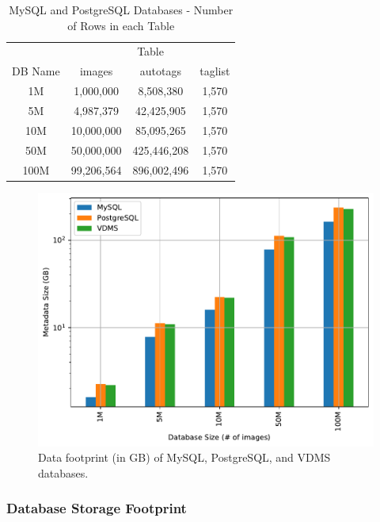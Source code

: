 \begin{table}[ht]
\caption{MySQL and PostgreSQL Databases - Number of Rows in each Table}
\centering
\begin{tabular}{c c c c}
\hline\hline
 & \multicolumn{3}{c}{Table}\\
\cline{2-4}
DB Name & images & autotags & taglist\\
\hline
1M   & 1,000,000  & 8,508,380   & 1,570\\
5M   & 4,987,379  & 42,425,905  & 1,570\\
10M  & 10,000,000 & 85,095,265  & 1,570\\
50M  & 50,000,000 & 425,446,208 & 1,570\\
100M & 99,206,564 & 896,002,496 & 1,570\\
\hline
\end{tabular}
\label{table:mysqltables}
\end{table}


\begin{figure}[ht]
\centering
\includegraphics[width=0.8\columnwidth]{figures/all_build_sizes_plot}
\caption{Data footprint (in GB) of MySQL, PostgreSQL, and VDMS databases.}
\label{fig:db_sizes}
\end{figure}

\subsubsection{Database Storage Footprint}

